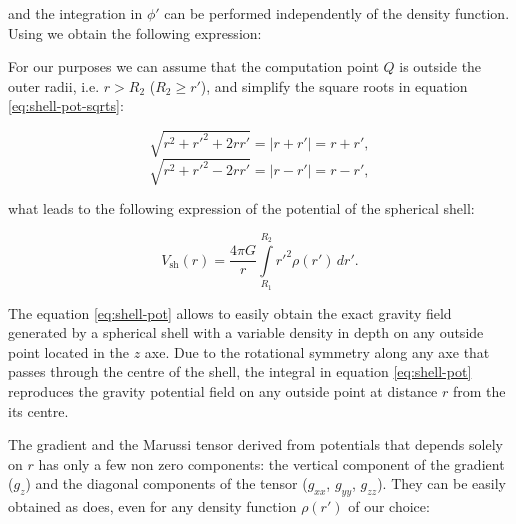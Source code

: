 \documentclass[extra]{gji}
\begin{document}
\noindent and the integration in $\phi'$ can be performed independently of the density function.
Using \citet{sagemath} we obtain the following expression:


For our purposes we can assume that the computation point $Q$ is outside the outer radii, i.e. $r>R_2$ ($R_2 \geq r'$), and simplify the square roots in equation \ref{eq:shell-pot-sqrts}:

\begin{equation}
    \sqrt{r^2 + r'^2 + 2rr'} = |r + r'| = r + r',
\end{equation}
\begin{equation}
    \sqrt{r^2 + r'^2 - 2rr'} = |r - r'| = r - r',
\end{equation}

\noindent what leads to the following expression of the potential of the spherical shell:

\begin{equation}
    V_\text{sh}(r) = \frac{4\pi G}{r}
    \int\limits_{R_1}^{R_2} {r'}^2 \rho(r') \, dr'.
\label{eq:shell-pot}
\end{equation}

The equation \ref{eq:shell-pot} allows to easily obtain the exact gravity field generated by a spherical shell with a variable density in depth on any outside point located in the $z$ axe.
Due to the rotational symmetry along any axe that passes through the centre of the shell, the integral in equation \ref{eq:shell-pot} reproduces the gravity potential field on any outside point at distance $r$ from the its centre.

The gradient and the Marussi tensor derived from potentials that depends solely on $r$ has only a few non zero components: the vertical component of the gradient ($g_z$) and the diagonal components of the tensor ($g_{xx}$, $g_{yy}$, $g_{zz}$).
They can be easily obtained as \citet{Grombein2013} does, even for any density function $\rho(r')$ of our choice:
\end{document}

